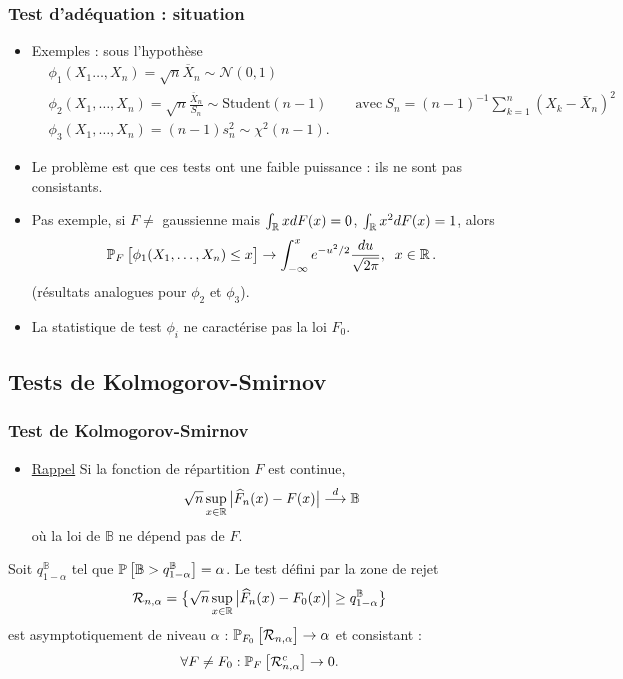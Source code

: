 \begin{frame}
\frametitle{Test d'adéquation : situation}
\begin{itemize}
\item \alert{Exemples : sous l'hypothèse}
  \begin{align*}
    &  \phi_1(X_1\ldots, X_n) = \sqrt{n}\overline{X}_n \sim {\mathcal N}(0,1) \\
    & \phi_2(X_1,\ldots, X_n) = \sqrt{n}\frac{\overline{X}_n}{S_n} \sim \text{Student}(n-1) \qquad \text{avec} \ S_n = (n-1)^{-1} \sum_{k=1}^n (X_k - \bar X_n)^2 \\
    & \phi_3(X_1,\ldots, X_n) = (n-1)s_n^2 \sim \chi^2(n-1).
  \end{align*}
\item Le problème est que ces tests \alert{ont une faible puissance} : ils ne sont pas consistants.
\item Pas exemple, si $F\neq$ gaussienne mais $\int_{\operatorname{{\mathbb R}}}xdF(x)=0$, $\int_{\operatorname{{\mathbb R}}}x^2dF(x)=1$, alors
$$\operatorname{{\mathbb P}}_{F}\big[\phi_1(X_1,\ldots,X_n) \leq x \big] \rightarrow \int_{-\infty}^x e^{-u^2/2}\frac{du}{\sqrt{2\pi}},\;\;x \in \operatorname{{\mathbb R}}.$$
(résultats analogues pour $\phi_2$ et $\phi_3$).
\item La statistique de test $\phi_i$ \alert{ne caractérise pas} la loi $F_0$.
\end{itemize}
\end{frame}


\subsection{Tests de Kolmogorov-Smirnov}

\begin{frame}
\frametitle{Test de Kolmogorov-Smirnov}
\begin{itemize}
\item \underline{Rappel} Si la fonction de répartition $F$ est continue,
$$\sqrt{n}\sup_{x\in \operatorname{{\mathbb R}}}\big|\widehat F_n(x)-F(x)\big| \stackrel{d}{\longrightarrow} \mathbb{B}$$
où la loi de $\mathbb{B}$ ne dépend pas de $F$.
\end{itemize}
\begin{prop}
Soit $q_{1-\alpha}^{\mathbb{B}}$ tel que $\operatorname{{\mathbb P}}\big[\mathbb{B}>q_{1-\alpha}^{\mathbb{B}}\big]=\alpha$. Le test défini par la zone de rejet
$${\mathcal R}_{n,\alpha} = \big\{\sqrt{n}\sup_{x\in \operatorname{{\mathbb R}}}\big|\widehat
F_n(x)-F_0(x)\big| \geq q_{1-\alpha}^{\mathbb{B}} \big\}$$
est
\alert{asymptotiquement de niveau $\alpha$ :} $\operatorname{{\mathbb P}}_{F_0}\big[ {\mathcal
  R}_{n,\alpha}\big]\rightarrow \alpha$ et \alert{consistant} :
$$\forall F \neq F_0: \operatorname{{\mathbb P}}_{F}\big[{\mathcal R}_{n,\alpha}^c\big] \rightarrow 0.$$
\end{prop}
\end{frame}


